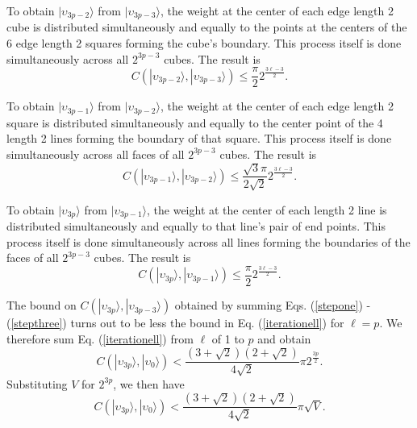\documentclass[twocolumn,amsmath,amssymb]{revtex4-1}
\begin{document}
To obtain $|\upsilon_{3p -2} \rangle $ from $|\upsilon_{3p -3} \rangle $,
the weight at the center of each edge length
2 cube is distributed simultaneously and equally
to the points at the centers of the 6
edge length 2 squares forming the cube's boundary.
This process itself is done simultaneously
across all $2^{3 p - 3}$ cubes.  The
result is
\begin{equation}
  \label{stepone}
C( |\upsilon_{3p -2} \rangle , |\upsilon_{3 p - 3} \rangle ) \le \frac{\pi}{2} 2^{\frac{3\ell - 3}{2}}.
\end{equation}

To obtain $|\upsilon_{3p -1} \rangle $ from $|\upsilon_{3p -2} \rangle $,
the weight at the center of each edge length 2
square is distributed 
simultaneously and equally to the 
center point of the 4 length 2 lines forming 
the boundary of that square. This process itself is done simultaneously
across all faces of all $2^{3 p - 3}$ cubes. 
The result is
\begin{equation}
  \label{steptwo}
C( |\upsilon_{3p -1} \rangle , |\upsilon_{3 p - 2} \rangle ) \le \frac{\sqrt{3}\pi}{2\sqrt{2}} 2^{\frac{3\ell - 3}{2}}.
\end{equation}

To obtain $|\upsilon_{3p} \rangle $ from $|\upsilon_{3p -1} \rangle $,
the weight at the center of each length  2 line
is distributed 
simultaneously and equally to that line's
pair of end points.
This process itself is done simultaneously
across all lines forming the boundaries of
the faces of all $2^{3 p - 3}$ cubes. 
The result is
\begin{equation}
  \label{stepthree}
C( |\upsilon_{3p} \rangle , |\upsilon_{3 p - 1} \rangle ) \le \frac{\pi}{2} 2^{\frac{3\ell - 3}{2}}.
\end{equation}


The bound on $C( |\upsilon_{3p} \rangle , |\upsilon_{3 p - 3} \rangle )$ obtained by summing
Eqs. (\ref{stepone}) - (\ref{stepthree}) turns out to be less the
bound in Eq. (\ref{iterationell}) for $\ell = p$.
We therefore sum Eq. (\ref{iterationell}) from $\ell$ of 1 to $p$ and obtain
\begin{equation}
\label{summedfanout}
C(|\upsilon_{3p} \rangle , |\upsilon_0 \rangle ) < \frac{(3 + \sqrt{2})(2+\sqrt{2})}{4\sqrt{2}}\pi 2^{\frac{3 p}{2}}.
\end{equation}
Substituting $V$ for $2^{3p}$, we then have
\begin{equation}
\label{summedfanout1}
C(|\upsilon_{3p} \rangle , |\upsilon_0 \rangle ) < \frac{(3 + \sqrt{2})(2 + \sqrt{2})}{4\sqrt{2}}\pi \sqrt{V}.
\end{equation}
\end{document}
